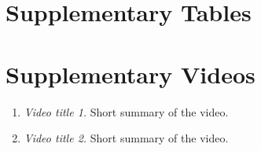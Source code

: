 \setlength{\parindent}{0pt}
\setlength{\intextsep}{0pt}  %
\vspace{5pt}
\begin{minipage}{\linewidth}
\begin{figure}[H]
\setlength{\abovecaptionskip}{0pt}
\justifying
\myriadpro\fontsize{8pt}{9.6pt}\selectfont
{}
\caption{}\label{suppfig:demo3}%
\end{figure}
\end{minipage}
\vspace{-8pt}
\setlength{\intextsep}{12pt}
\setlength{\abovecaptionskip}{2pt}



\section{Supplementary Tables}







\clearpage


\section{Supplementary Videos}

\begin{enumerate}[label={\textbf{\SV{\theenumi}:}},leftmargin=*]
  \item \textit{Video title 1.} Short summary of the video. 
  \item \textit{Video title 2.} Short summary of the video. 
\end{enumerate} 


